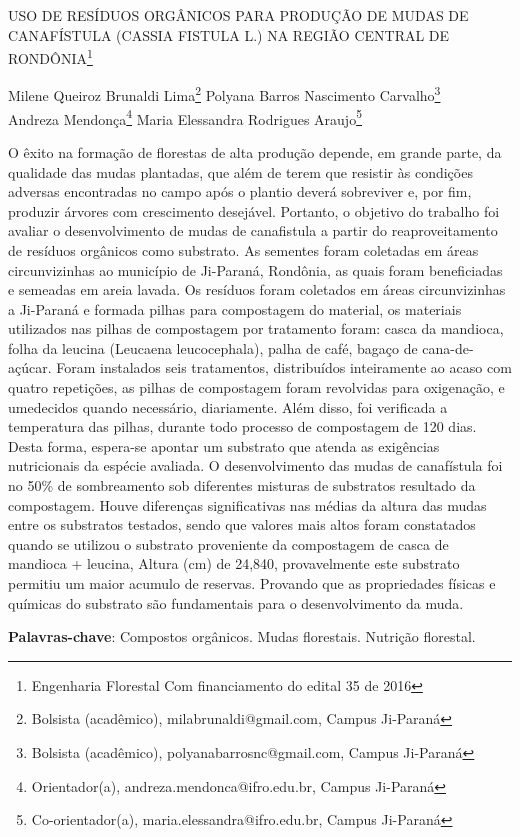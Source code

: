 \documentclass[article,12pt,onesidea,4paper,english,brazil]{abntex2}
\begin{document}
	
	
	\frenchspacing 
	
	\begin{center}
		\LARGE USO DE RESÍDUOS ORGÂNICOS PARA PRODUÇÃO DE MUDAS DE CANAFÍSTULA
		(CASSIA FISTULA L.) NA REGIÃO CENTRAL DE RONDÔNIA\footnote{Engenharia Florestal
			Com financiamento do edital 35 de 2016}
		
		\normalsize
		Milene Queiroz Brunaldi Lima\footnote{Bolsista (acadêmico), milabrunaldi@gmail.com, Campus Ji-Paraná} 
		Polyana Barros Nascimento Carvalho\footnote{Bolsista (acadêmico), polyanabarrosnc@gmail.com, Campus Ji-Paraná} \\
		Andreza Mendonça\footnote{Orientador(a), andreza.mendonca@ifro.edu.br, Campus Ji-Paraná} 
		Maria Elessandra Rodrigues Araujo\footnote{Co-orientador(a), maria.elessandra@ifro.edu.br, Campus Ji-Paraná} 
	\end{center}
	
	\noindent O êxito na formação de florestas de alta produção depende, em grande parte, da qualidade
	das mudas plantadas, que além de terem que resistir às condições adversas encontradas no
	campo após o plantio deverá sobreviver e, por fim, produzir árvores com crescimento
	desejável. Portanto, o objetivo do trabalho foi avaliar o desenvolvimento de mudas de
	canafistula a partir do reaproveitamento de resíduos orgânicos como substrato. As sementes
	foram coletadas em áreas circunvizinhas ao município de Ji-Paraná, Rondônia, as quais
	foram beneficiadas e semeadas em areia lavada. Os resíduos foram coletados em áreas
	circunvizinhas a Ji-Paraná e formada pilhas para compostagem do material, os materiais
	utilizados nas pilhas de compostagem por tratamento foram: casca da mandioca, folha da
	leucina (Leucaena leucocephala), palha de café, bagaço de cana-de-açúcar. Foram
	instalados seis tratamentos, distribuídos inteiramente ao acaso com quatro repetições, as
	pilhas de compostagem foram revolvidas para oxigenação, e umedecidos quando
	necessário, diariamente. Além disso, foi verificada a temperatura das pilhas, durante todo
	processo de compostagem de 120 dias. Desta forma, espera-se apontar um substrato que
	atenda as exigências nutricionais da espécie avaliada. O desenvolvimento das mudas de
	canafístula foi no 50\% de sombreamento sob diferentes misturas de substratos resultado da
	compostagem. Houve diferenças significativas nas médias da altura das mudas entre os
	substratos testados, sendo que valores mais altos foram constatados quando se utilizou o
	substrato proveniente da compostagem de casca de mandioca + leucina, Altura (cm) de
	24,840, provavelmente este substrato permitiu um maior acumulo de reservas. Provando
	que as propriedades físicas e químicas do substrato são fundamentais para o
	desenvolvimento da muda.
	
	\vspace{\onelineskip}
	
	\noindent
	\textbf{Palavras-chave}: Compostos orgânicos. Mudas florestais. Nutrição florestal.
	
\end{document}
